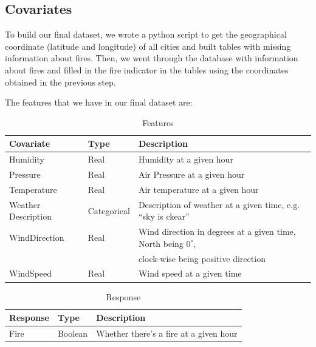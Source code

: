 \documentclass[10pt]{article}
\begin{document}
\subsection{Covariates}
To build our final dataset, we wrote a python script to get the
geographical coordinate (latitude and longitude) of all cities and built
tables with missing information about fires. Then, we went through the
database with information about fires and filled in the fire indicator
in the tables using the coordinates obtained in the previous step.\par
The features that we have in our final dataset are:
\begin{table}[H]
    \centering
    \caption{Features}
    \begin{tabular}{l|l|l}
        Covariate &Type &Description\\\hline
        Humidity &Real &Humidity at a given hour\\
        Pressure &Real &Air Pressure at a given hour\\
        Temperature &Real &Air temperature at a given hour\\
        Weather Description &Categorical &Description of weather at
        a given time, e.g. ``sky is ckear''\\
        WindDirection &Real &Wind direction in degrees at a given time,
        North being $0^\circ$,\\
        & &clock-wise being positive direction\\
        WindSpeed &Real &Wind speed at a given time\\
    \end{tabular}
\end{table}
\begin{table}[H]
    \centering
    \caption{Response}
    \begin{tabular}{l|l|l}
        Response &Type &Description\\\hline
        Fire &Boolean &Whether there's a fire at a given hour\\
    \end{tabular}
\end{table}
\end{document}
